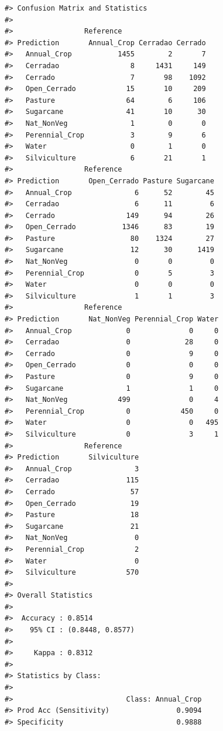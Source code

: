 \documentclass[
  11pt,
]{report}
\begin{document}
\begin{lstlisting}
#> Confusion Matrix and Statistics
#> 
#>                 Reference
#> Prediction       Annual_Crop Cerradao Cerrado
#>   Annual_Crop           1455        2       7
#>   Cerradao                 8     1431     149
#>   Cerrado                  7       98    1092
#>   Open_Cerrado            15       10     209
#>   Pasture                 64        6     106
#>   Sugarcane               41       10      30
#>   Nat_NonVeg               1        0       0
#>   Perennial_Crop           3        9       6
#>   Water                    0        1       0
#>   Silviculture             6       21       1
#>                 Reference
#> Prediction       Open_Cerrado Pasture Sugarcane
#>   Annual_Crop               6      52        45
#>   Cerradao                  6      11         6
#>   Cerrado                 149      94        26
#>   Open_Cerrado           1346      83        19
#>   Pasture                  80    1324        27
#>   Sugarcane                12      30      1419
#>   Nat_NonVeg                0       0         0
#>   Perennial_Crop            0       5         3
#>   Water                     0       0         0
#>   Silviculture              1       1         3
#>                 Reference
#> Prediction       Nat_NonVeg Perennial_Crop Water
#>   Annual_Crop             0              0     0
#>   Cerradao                0             28     0
#>   Cerrado                 0              9     0
#>   Open_Cerrado            0              0     0
#>   Pasture                 0              9     0
#>   Sugarcane               1              1     0
#>   Nat_NonVeg            499              0     4
#>   Perennial_Crop          0            450     0
#>   Water                   0              0   495
#>   Silviculture            0              3     1
#>                 Reference
#> Prediction       Silviculture
#>   Annual_Crop               3
#>   Cerradao                115
#>   Cerrado                  57
#>   Open_Cerrado             19
#>   Pasture                  18
#>   Sugarcane                21
#>   Nat_NonVeg                0
#>   Perennial_Crop            2
#>   Water                     0
#>   Silviculture            570
#> 
#> Overall Statistics
#>                             
#>  Accuracy : 0.8514          
#>    95% CI : (0.8448, 0.8577)
#>                             
#>     Kappa : 0.8312          
#> 
#> Statistics by Class:
#> 
#>                           Class: Annual_Crop
#> Prod Acc (Sensitivity)                0.9094
#> Specificity                           0.9888

\end{lstlisting}
\end{document}
